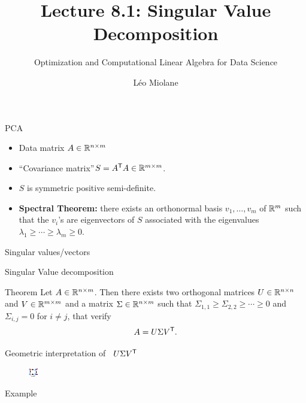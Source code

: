 \documentclass{beamer}
\title{Lecture 8.1: Singular Value Decomposition}
\subtitle{Optimization and Computational Linear Algebra for Data Science}
\author{Léo Miolane}
\date{}
\begin{document}
\setcounter{showProgressBar}{0}
\setcounter{showSlideNumbers}{0}

\frame{\titlepage}
\setcounter{framenumber}{0}
\setcounter{showSlideNumbers}{1}



\begin{frame}[t]{PCA}
	\grid
	
	\begin{itemize}
		\item Data matrix \quad $A \in \mathbb{R}^{n \times m}$
			\vspace{1mm}
		\item ``Covariance matrix''\quad $S = A^{{\sf T}} A \in \mathbb{R}^{m \times m}$.
			\vspace{1mm}
		\item $S$ is symmetric positive semi-definite.
			\vspace{1mm}
		\item \textbf{Spectral Theorem:} there exists an orthonormal basis $v_1, \dots, v_m$ of $\mathbb{R}^m$ such that the $v_i$'s are eigenvectors of $S$ associated with the eigenvalues $\lambda_1 \geq \cdots \geq \lambda_m \geq 0$.
	\end{itemize}

\end{frame}

\begin{frame}[t]{Singular values/vectors}
	\grid

\end{frame}
\begin{frame}[t]{Singular Value decomposition}
	\grid

	\vspace{-0.3cm}
	\begin{block}{Theorem}
		Let $A \in \mathbb{R}^{n \times m}$. Then there exists two orthogonal matrices $U \in \mathbb{R}^{n \times n}$ and $V \in \mathbb{R}^{m \times m}$ and a matrix $\Sigma \in \mathbb{R}^{n \times m}$ such that $\Sigma_{1,1} \geq \Sigma_{2,2}  \geq \cdots \geq 0$ and $\Sigma_{i,j} = 0$ for $i\neq j$, that verify
		$$
		A = U \Sigma V^{{\sf T}}.
		$$
	\end{block}

\end{frame}

\begin{frame}[t]{Geometric interpretation of \ $U\Sigma V^{{\sf T}}$}
\begin{figure}[H]
	\begin{center}
	\includegraphics[width = 0.6\linewidth]{./svd.pdf}
	\end{center}
\end{figure}

\end{frame}

\begin{frame}[t]{Example}
	\grid

\end{frame}
\end{document}
